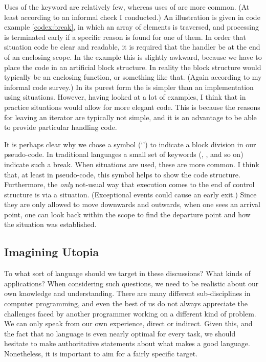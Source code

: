 \documentclass[10pt]{amsart}
\begin{document}
Uses of the \texttt{} keyword are relatively few,
whereas uses of \texttt{} are more common.  (At least
according to an informal check I conducted.)  An illustration is given
in code example \ref{codex:break}, in which an array of elements is
traversed, and processing is terminated early if a specific reason is
found for one of them.  In order that situation code be clear and
readable, it is required that the handler be at the end of an
enclosing scope.  In the example this is slightly awkward, because we
have to place the code in an artificial block structure.  In reality
the block structure would typically be an enclosing function, or
something like that.  (Again according to my informal code survey.)
In its purest form the \texttt{} is simpler than an
implementation using situations.  However, having looked at a lot of
examples, I think that in practice situations would allow for more
elegant code.  This is because the reasons for leaving an iterator are
typically not simple, and it is an advantage to be able to provide
particular handling code.

It is perhaps clear why we chose a symbol (`\texttt{\cdedent}') to
indicate a block division in our pseudo-code.  In traditional
languages a small set of keywords (\texttt{},
\texttt{}, and so on) indicate such a break.  When
situations are used, these
are more common.  I think that, at least in pseudo-code, this symbol
helps to show the code structure.  Furthermore, the \emph{only}
not-usual way that execution comes to the end of control
structure is via a
situation.  (Exceptional events could cause an early exit.)  Since
they are only allowed to move downwards and
outwards, when one sees an arrival point, one can look back within the
scope to find the departure point and how the situation was
established.

\subsection{Imagining Utopia}

To what sort of language should we target in these discussions?  What
kinds of applications?  When considering such questions, we need to be
realistic about our own knowledge and understanding.  There are many
different sub-disciplines in computer programming, and even the best
of us do not always appreciate the challenges faced by another
programmer working on a different kind of problem.  We can only speak
from our own experience, direct or indirect.  Given this, and the fact
that no language is even nearly optimal for every task, we should
hesitate to make authoritative statements about what makes a good
language.  Nonetheless, it is important to aim for a fairly specific
target.
\end{document}

